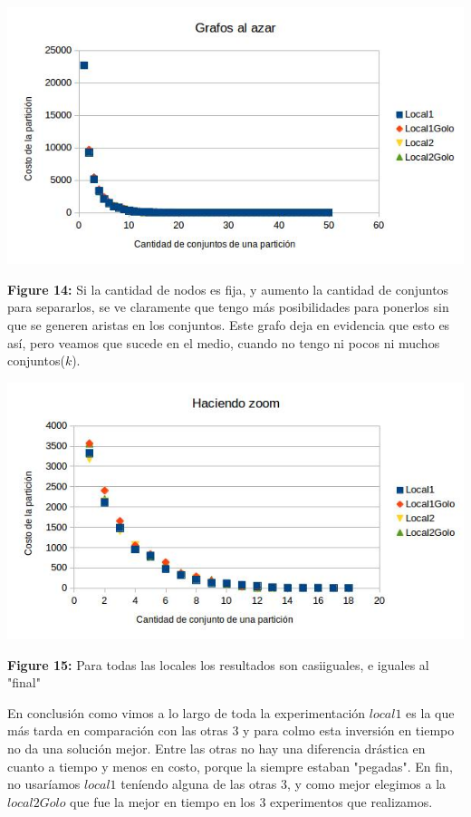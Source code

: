 \documentclass[a4paper]{article}
\begin{document}
\includegraphics[width=\textwidth,height=\textheight,keepaspectratio
]{N50K1-50Suma.jpg}
\begin {flushleft}
\textbf{Figure 14:} Si la cantidad de nodos es fija, y aumento la cantidad de conjuntos para separarlos, se ve claramente que tengo más posibilidades para ponerlos sin que se generen aristas en los conjuntos. Este grafo deja en evidencia que esto es así, pero veamos que sucede en el medio, cuando no tengo ni pocos ni muchos conjuntos($k$).
\end{flushleft}

\includegraphics[width=\textwidth,height=\textheight,keepaspectratio
]{N50K1-50SumaZoom.jpg}
\begin {flushleft}
\textbf{Figure 15:} Para todas las locales los resultados son casiiguales, e iguales al "final"
\end{flushleft}

En conclusión como vimos a lo largo de toda la experimentación $local1$ es la que más tarda en comparación con las otras 3 y para colmo esta inversión en tiempo no da una solución mejor. Entre las otras no hay una diferencia drástica en cuanto a tiempo y menos en costo, porque la siempre estaban "pegadas".\newline
En fin, no usaríamos $local1$ teníendo alguna de las otras 3, y como mejor elegimos a la $local2Golo$ que fue la mejor en tiempo en los 3 experimentos que realizamos.
 
\end{document}
